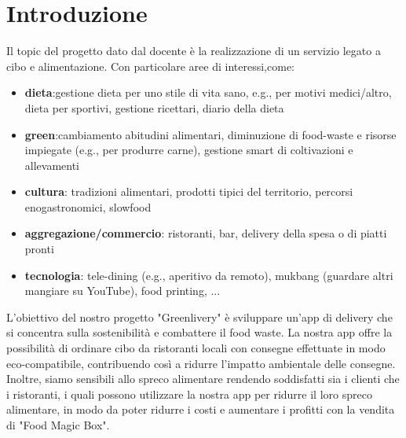 \documentclass{article}
\begin{document}
\section{Introduzione}\par
Il topic del progetto dato dal docente è la realizzazione di un servizio legato a cibo e alimentazione. Con particolare aree di interessi,come: \par
\begin{itemize}
    \item \textbf{dieta}:gestione dieta per uno stile di vita sano, e.g., per motivi medici/altro, dieta per sportivi, gestione ricettari, diario della dieta \par
    \item \textbf{green}:cambiamento abitudini alimentari, diminuzione di food-waste e risorse impiegate (e.g., per produrre carne), gestione smart di coltivazioni e allevamenti \par
    \item \textbf{cultura}: tradizioni alimentari, prodotti tipici del territorio, percorsi enogastronomici, slowfood\par
    \item \textbf{aggregazione/commercio}: ristoranti, bar, delivery della spesa o di piatti pronti \par
    \item \textbf{tecnologia}: tele-dining (e.g., aperitivo da remoto), mukbang (guardare altri mangiare su YouTube), food printing, ... \par
\end{itemize}
\vspace{1cm}



     \par
    \vspace{0.5cm}
    L'obiettivo del nostro progetto "Greenlivery" è sviluppare un'app di delivery che si concentra sulla sostenibilità e combattere il food waste. La nostra app offre la possibilità di ordinare cibo da ristoranti locali con consegne effettuate in modo eco-compatibile, contribuendo così a ridurre l'impatto ambientale delle consegne. Inoltre, siamo sensibili allo spreco alimentare rendendo soddisfatti sia i clienti che i ristoranti, i quali possono utilizzare la nostra app per ridurre il loro spreco alimentare, in modo da poter ridurre i costi e aumentare i profitti con la vendita di "Food Magic Box".
    \vspace{1cm}
    
\end{document}
